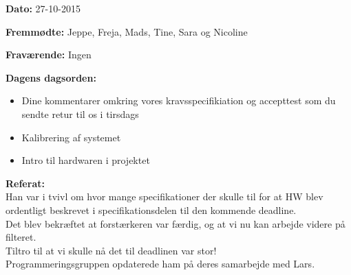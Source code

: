 \textbf{Dato:} 27-10-2015

\textbf{Fremmødte:} Jeppe, Freja, Mads, Tine, Sara og Nicoline

\textbf{Fraværende:} Ingen

\textbf{Dagens dagsorden:}
\begin{itemize}
	\item Dine kommentarer omkring vores kravsspecifikiation og accepttest som du sendte retur til os i tirsdags
	\item Kalibrering af systemet
    \item Intro til hardwaren i projektet\\
\end{itemize}

\textbf{Referat:}
\\ Han var i tvivl om hvor mange specifikationer der skulle til for at HW blev ordentligt beskrevet i specifikationsdelen til den kommende deadline. 
\\ Det blev bekræftet at forstærkeren var færdig, og at vi nu kan arbejde videre på filteret. 
\\Tiltro til at vi skulle nå det til deadlinen var stor! 
\\Programmeringsgruppen opdaterede ham på deres samarbejde med Lars. 
